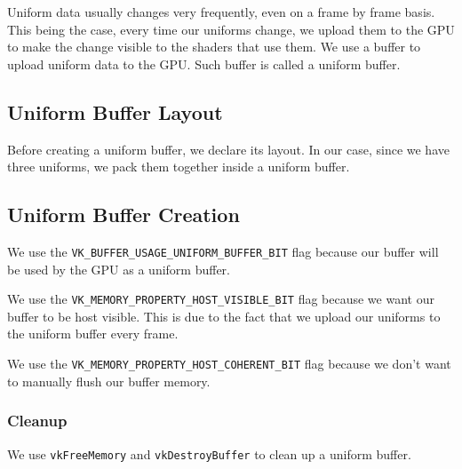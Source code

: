 Uniform data usually changes very frequently, even on a frame by frame basis.
This being the case, every time our uniforms change, we upload them
to the GPU to make the change visible to the shaders that use them.
We use a buffer to upload uniform data to the GPU.
Such buffer is called a uniform buffer.

\subsection{Uniform Buffer Layout}

Before creating a uniform buffer, we declare its layout.
In our case, since we have three uniforms, we pack them
together inside a uniform buffer.

\begin{minipage}{\linewidth}{\noindent}
    
\end{minipage}

\subsection{Uniform Buffer Creation}

We use the \texttt{VK\_BUFFER\_USAGE\_UNIFORM\_BUFFER\_BIT} flag because
our buffer will be used by the GPU as a uniform buffer.

We use the \texttt{VK\_MEMORY\_PROPERTY\_HOST\_VISIBLE\_BIT} flag because
we want our buffer to be host visible.
This is due to the fact that we upload our uniforms to the uniform buffer
every frame.

We use the \texttt{VK\_MEMORY\_PROPERTY\_HOST\_COHERENT\_BIT} flag because
we don't want to manually flush our buffer memory.

\begin{minipage}{\linewidth}{\noindent}
    
\end{minipage}

\subsubsection{Cleanup}

We use \texttt{vkFreeMemory} and \texttt{vkDestroyBuffer} to clean up a
uniform buffer.

